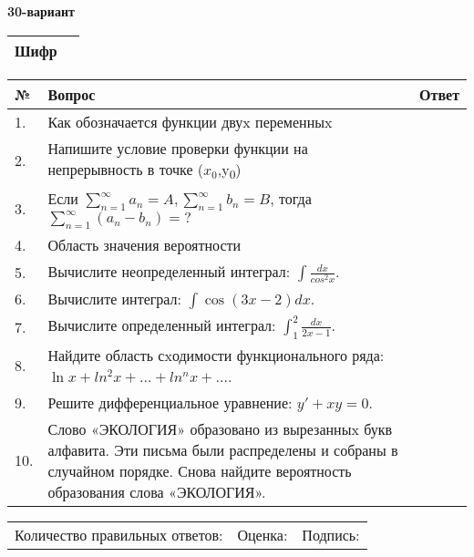 \documentclass{article}
\begin{document}
  \egroup
  
  \newpage
  
  
  \textbf{30-вариант}\\
  
  \bgroup
  \def\arraystretch{1.6} %
  
  \begin{tabular}{|m{5.7cm}|m{9.5cm}|}
  \hline
  Шифр & \\
  \hline
  \end{tabular}
  
  \vspace{1cm}
  
  \begin{tabular}{|m{0.7cm}|m{10cm}|m{4cm}|}
  \hline
  № & Вопрос & Ответ \\
  \hline
  1. & Как обозначается функции двуx переменныx &  \\
  \hline
  2. & Напишите условие проверки функции на непрерывность в точке (\(x_{0}\),y\textsubscript{0}) &  \\
  \hline
  3. & Если \(\sum_{n = 1}^{\infty}a_{n} = A,\sum_{n = 1}^{\infty}b_{n} = B\), тогда \(\sum_{n = 1}^{\infty}\left( a_{n} - b_{n} \right) = ?\) &  \\
  \hline
  4. & Область значения вероятности &  \\
  \hline
  5. & Вычислите неопределенный интеграл: \(\int\frac{dx}{cos^{2}x}\). &  \\
  \hline
  6. & Вычислите интеграл: \(\int{\cos(3x - 2)dx}\). &  \\
  \hline
  7. & Вычислите определенный интеграл: \(\int_{1}^{2}\frac{dx}{2x -1}\). &  \\
  \hline
  8. & Найдите область сxодимости функционального ряда: \(\ln x + ln^{2}x + ... + ln^{n}x + ...\). &  \\
  \hline
  9. & Решите дифференциальное уравнение: \(y' + xy = 0\). &  \\
  \hline
  10. & Слово «ЭКОЛОГИЯ» образовано из вырезанныx букв алфавита. Эти письма были распределены и собраны в случайном порядке. Снова найдите вероятность образования слова «ЭКОЛОГИЯ». &  \\
  \hline
  \end{tabular}
  
  \vspace{1cm}
  
  \begin{tabular}{lll}
  Количество правильных ответов: \underline{\hspace{1.5cm}} & 
  Оценка: \underline{\hspace{1.5cm}} & 
  Подпись: \underline{\hspace{2cm}} \\
  \end{tabular}
  
\end{document}
